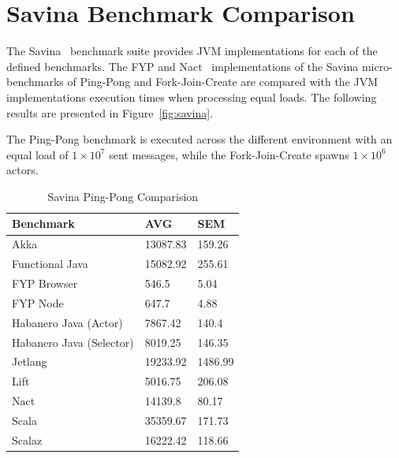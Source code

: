 \documentclass[oneside]{um-fict}
\begin{document}
\section{Savina Benchmark Comparison}
The Savina~\cite{savina} benchmark suite provides JVM implementations for each of the defined benchmarks. The FYP and Nact~\cite{nact} implementations of the Savina micro-benchmarks of Ping-Pong and Fork-Join-Create are compared with the JVM implementations execution times when processing equal loads. The following results are presented in Figure~\ref{fig:savina}.

The Ping-Pong benchmark is executed across the different environment with an equal load of $1\times10^7$ sent messages, while the Fork-Join-Create spawns $1\times10^6$ actors.
\begin{table}[H]
    \begin{center}
        \begin{tabular}{|l|ll|}
        \hline
        Benchmark                & AVG  & SEM \\ \hline
        Akka                     & 13087.83 & 159.26         \\
        Functional Java          & 15082.92 & 255.61         \\
        FYP Browser              & 546.5    & 5.04           \\
        FYP Node                 & 647.7    & 4.88           \\
        Habanero Java (Actor)    & 7867.42  & 140.4          \\
        Habanero Java (Selector) & 8019.25  & 146.35         \\
        Jetlang                  & 19233.92 & 1486.99        \\
        Lift                     & 5016.75  & 206.08         \\
        Nact                     & 14139.8  & 80.17          \\
        Scala                    & 35359.67 & 171.73         \\
        Scalaz                   & 16222.42 & 118.66         \\ \hline
        \end{tabular}
        \caption{Savina Ping-Pong Comparision}\label{tab:savinapingpong}
    \end{center}
\end{table}
\end{document}
